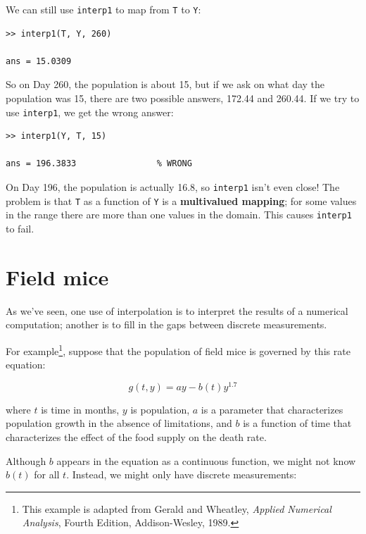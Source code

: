 \documentclass[
]{book}
\begin{document}
We can still use {\tt interp1} to map from {\tt T} to {\tt Y}:

\begin{verbatim}
>> interp1(T, Y, 260)

ans = 15.0309
\end{verbatim}

So on Day 260, the population is about 15, but if we ask on what
day the population was 15, there are two possible answers, 172.44
and 260.44.  If we try to use {\tt interp1}, we get the wrong answer:

\begin{verbatim}
>> interp1(Y, T, 15)

ans = 196.3833                % WRONG
\end{verbatim}

On Day 196, the population is actually 16.8, so {\tt interp1} isn't
even close!  The problem is that {\tt T} as a function of {\tt Y} is a
{\bf multivalued mapping}; for some values in the range there are more
than one values in the domain.  This causes {\tt interp1} to fail.


\section{Field mice}

As we've seen, one use of interpolation is to interpret the results
of a numerical computation; another is to fill in the gaps between
discrete measurements.

For example\footnote{This example is adapted from Gerald and Wheatley,
{\em Applied Numerical Analysis}, Fourth Edition, Addison-Wesley,
1989.}, suppose that the population of field mice is governed by this
rate equation:

\begin{equation}
g(t, y) = ay - b(t) y^{1.7}
\end{equation}

where $t$ is time in months, $y$ is population, $a$ is a parameter
that characterizes population growth in the absence of limitations,
and $b$ is a function of time that characterizes the effect of the
food supply on the death rate.

Although $b$ appears in the equation as a continuous function, we
might not know $b(t)$ for all $t$.  Instead, we might only have discrete
measurements:
\end{document}
